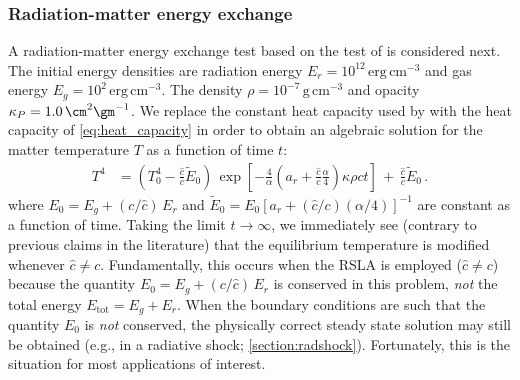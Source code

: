 \documentclass[fleqn,usenatbib]{mnras}
\begin{document}
\subsubsection{Radiation-matter energy exchange}
\label{section:equilibrium}
A radiation-matter energy exchange test based on the test of \cite{Turner_2001} is considered next. The initial energy densities are radiation energy $E_r = 10^{12} \, \text{erg} \, \text{cm}^{-3}$ and gas energy $E_g = 10^2 \, \text{erg} \, \text{cm}^{-3}$. The density $\rho = 10^{-7} \, \text{g} \, \text{cm}^{-3}$ and opacity $\kappa_P = 1.0 \, \cm^{2} \gm^{-1}$. We replace the constant heat capacity used by \cite{Turner_2001} with the heat capacity of \autoref{eq:heat_capacity} in order to obtain an algebraic solution for the matter temperature $T$ as a function of time $t$:
\begin{align}
T^4 &= \left( T_{0}^4 - \frac{\hat c}{c} \tilde E_0 \right) \, \exp \left[ -\frac{4}{\alpha} \left( a_r + \frac{\hat c}{c} \frac{\alpha}{4} \right) \kappa \rho c t \right] \, + \, \frac{\hat c}{c} \tilde E_0 \, .
\end{align}
where $E_0 = E_{g} + (c/\hat c) \, E_{r}$ and $\tilde E_0 = E_0 \left[ a_r + (\hat c / c) (\alpha / 4) \right]^{-1}$ are constant as a function of time. Taking the limit $t \rightarrow \infty$, we immediately see (contrary to previous claims in the literature) that the equilibrium temperature is modified whenever $\hat c \neq c$. Fundamentally, this occurs when the RSLA is employed ($\hat c \neq c$) because the quantity $E_0 = E_g + (c / \hat c) \, E_r$ is conserved in this problem, \emph{not} the total energy $E_{\text{tot}} = E_g + E_r$. When the boundary conditions are such that the quantity $E_0$ is \emph{not} conserved, the physically correct steady state solution may still be obtained (e.g., in a radiative shock; \autoref{section:radshock}). Fortunately, this is the situation for most applications of interest.
\end{document}
